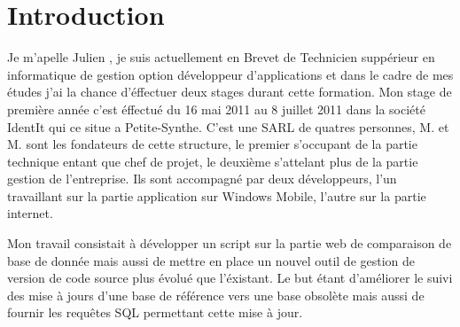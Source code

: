 \chapter{Introduction}

Je m'apelle Julien , je suis actuellement en Brevet de Technicien suppérieur en informatique de gestion option développeur d'applications et dans le cadre de
mes études j'ai la chance d'éffectuer deux stages durant cette formation. Mon stage de première année c'est éffectué du 16 mai 2011 au 8 juillet 2011 dans la société IdentIt
qui ce situe a Petite-Synthe. C'est une SARL de quatres personnes, M. et M. sont les fondateurs de cette structure, le premier s'occupant de la
partie technique entant que chef de projet, le deuxième s'attelant plus de la partie gestion de l'entreprise. Ils sont accompagné par deux développeurs, l'un travaillant sur
la partie application sur Windows Mobile, l'autre sur la partie internet.

Mon travail consistait à développer un script sur la partie web de comparaison de base de donnée mais aussi de mettre en place un nouvel outil de gestion de version de code
source plus évolué que l'éxistant. Le but étant d'améliorer le suivi des mise à jours d'une base de référence vers une base obsolète mais aussi de fournir les requêtes SQL
permettant cette mise à jour.

\clearpage
